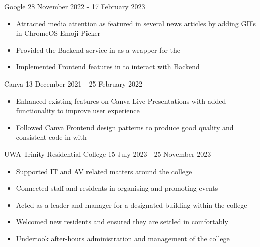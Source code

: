 \documentclass[paper=a4,fontsize=8.5pt]{resume}
\begin{document}
{	\divider

		{Google}
		{28 November 2022 - 17 February 2023}
	\begin{itemize}
		\item Attracted media attention as featured in several \href{https://chromeunboxed.com/gif-support-chromebook-chrome-os-emoji-picker/}{news articles} by adding GIFs in ChromeOS Emoji Picker
		\item Provided the Backend service in  as a wrapper for the 
		\item Implemented Frontend features in  to interact with Backend
	\end{itemize}

	\divider

		{Canva}
		{13 December 2021 - 25 February 2022}
	\begin{itemize}
		\item Enhanced existing features on Canva Live Presentations with added functionality to improve user experience
		\item Followed Canva Frontend design patterns to produce good quality and consistent code in  with 
	\end{itemize}

	\divider

		{UWA Trinity Residential College}
		{15 July 2023 - 25 November 2023}
	\begin{itemize}
		\item Supported IT and AV related matters around the college
		\item Connected staff and residents in organising and promoting events
		\item Acted as a leader and manager for a designated building within the college
		\item Welcomed new residents and ensured they are settled in comfortably
		\item Undertook after-hours administration and management of the college
	\end{itemize}



}
\end{document}
